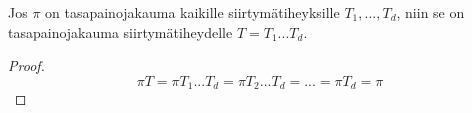 \begin{lause}\label{cyclic-kernel}
	Jos $\pi$ on tasapainojakauma kaikille siirtymätiheyksille $T_1,...,T_d$, niin se on tasapainojakauma siirtymätiheydelle $T = T_1...T_d$.
\end{lause}

\begin{proof}
	\begin{equation*}
		\pi T = \pi T_1...T_d = \pi T_2...T_d = ... = \pi T_d = \pi
	\end{equation*}
\end{proof}
























































